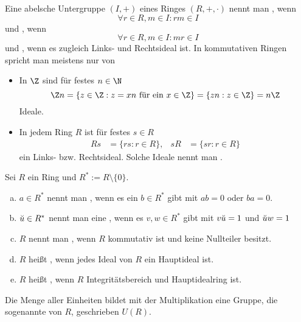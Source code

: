 \begin{df*}
	Eine abelsche Untergruppe $(I, +)$ eines Ringes $(R, +, \cdot)$ nennt man , wenn
	\[
		\forall r \in R, m \in I : rm \in I
	\]
	und , wenn
	\[
		\forall r \in R, m \in I : m r \in I
	\]
	und , wenn es zugleich Links- und Rechtsideal ist.
	In kommutativen Ringen spricht man meistens nur von 
\end{df*}

\begin{ex*}
	\begin{itemize}
		\item
			In $\Z$ sind für festes $n \in \N$
			\[
				\Z n = \{ z \in \Z : z = x n \text{ für ein $x \in \Z$} \}
				= \{ z n : z \in \Z \}
				= n \Z
			\]
			Ideale.
		\item
			In jedem Ring $R$ ist für festes $s \in R$
			\begin{align*}
				Rs &= \{ r s : r \in R \}, &
				sR &= \{ sr : r \in R \}
			\end{align*}
			ein Links- bzw. Rechtsideal.
			Solche Ideale nennt man .
	\end{itemize}
\end{ex*}

\begin{df} \label{1.1}
	Sei $R$ ein Ring und $R^* := R \setminus \{0\}$.
	\begin{enumerate}[a)]
		\item
			$a \in R^*$ nennt man , wenn es ein $b \in R^*$ gibt mit $ab = 0$ oder $ba = 0$.
		\item
			$\breve{u} \in R^*$ nennt man eine , wenn es $v, w \in R^*$ gibt mit $v \breve{u} = 1$ und $\breve{u} w = 1$
		\item
			$R$ nennt man , wenn $R$ kommutativ ist und keine Nullteiler besitzt.
		\item
			$R$ heißt , wenn jedes Ideal von $R$ ein Hauptideal ist.
		\item
			$R$ heißt , wenn $R$ Integritätsbereich und Hauptidealring ist.
	\end{enumerate}
	\begin{note}
		Die Menge aller Einheiten bildet mit der Multiplikation eine Gruppe, die sogenannte  von $R$, geschrieben $U(R)$.
	\end{note}
\end{df}

